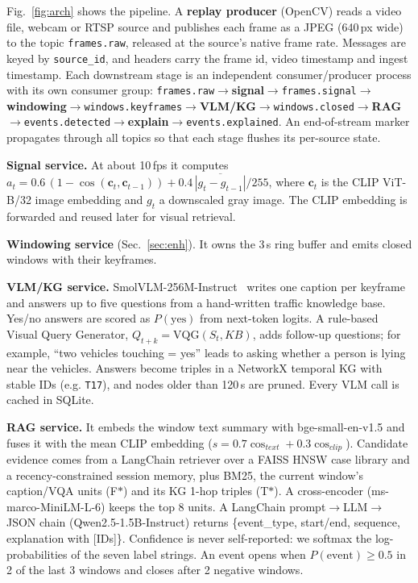 \documentclass[conference]{IEEEtran}
\begin{document}
Fig.~\ref{fig:arch} shows the pipeline. A \textbf{replay producer} (OpenCV) reads a video file, webcam or
RTSP source and publishes each frame as a JPEG (640\,px wide) to the topic \texttt{frames.raw}, released at
the source's native frame rate. Messages are keyed by \texttt{source\_id}, and headers carry the frame id,
video timestamp and ingest timestamp. Each downstream stage is an independent consumer/producer process
with its own consumer group:
\texttt{frames.raw}$\rightarrow$\textbf{signal}$\rightarrow$\texttt{frames.signal}$\rightarrow$\textbf{windowing}$\rightarrow$\texttt{windows.keyframes}$\rightarrow$\textbf{VLM/KG}$\rightarrow$\texttt{windows.closed}$\rightarrow$\textbf{RAG}$\rightarrow$\texttt{events.detected}$\rightarrow$\textbf{explain}$\rightarrow$\texttt{events.explained}.
An end-of-stream marker propagates through all topics so that each stage flushes its per-source state.

\textbf{Signal service.} At about 10\,fps it computes
$a_t = 0.6\,(1-\cos(\mathbf{c}_t,\mathbf{c}_{t-1})) + 0.4\,\overline{|g_t-g_{t-1}|}/255$,
where $\mathbf{c}_t$ is the CLIP ViT-B/32 image embedding and $g_t$ a downscaled gray image. The CLIP
embedding is forwarded and reused later for visual retrieval.

\textbf{Windowing service} (Sec.~\ref{sec:enh}). It owns the 3\,s ring buffer and emits closed windows with
their keyframes.

\textbf{VLM/KG service.} SmolVLM-256M-Instruct~\cite{smolvlm} writes one caption per keyframe and answers
up to five questions from a hand-written traffic knowledge base. Yes/no answers are scored as
$P(\text{yes})$ from next-token logits. A rule-based Visual Query Generator, $Q_{t+k}=\mathrm{VQG}(S_t,KB)$,
adds follow-up questions; for example, ``two vehicles touching = yes'' leads to asking whether a person is
lying near the vehicles. Answers become triples in a NetworkX temporal KG with stable IDs (e.g. \texttt{T17}),
and nodes older than 120\,s are pruned. Every VLM call is cached in SQLite.

\textbf{RAG service.} It embeds the window text summary with bge-small-en-v1.5 and fuses it with the mean
CLIP embedding ($s=0.7\cos_{text}+0.3\cos_{clip}$). Candidate evidence comes from a LangChain retriever
over a FAISS HNSW case library and a recency-constrained session memory, plus BM25, the current window's
caption/VQA units (F$*$) and its KG 1-hop triples (T$*$). A cross-encoder (ms-marco-MiniLM-L-6) keeps the
top 8 units. A LangChain prompt$\rightarrow$LLM$\rightarrow$JSON chain (Qwen2.5-1.5B-Instruct) returns
\{event\_type, start/end, sequence, explanation with [IDs]\}. Confidence is never self-reported: we softmax
the log-probabilities of the seven label strings. An event opens when $P(\text{event})\ge0.5$ in 2 of the
last 3 windows and closes after 2 negative windows.
\end{document}
